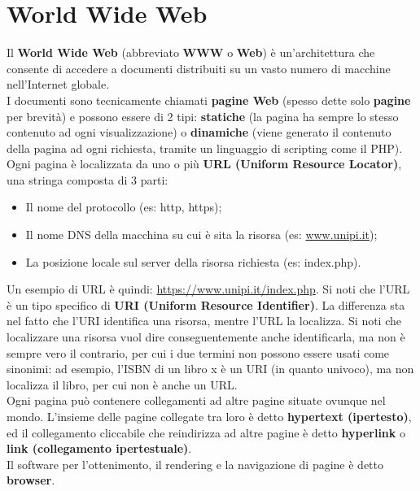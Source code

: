 \section{World Wide Web}
    Il \textbf{World Wide Web} (abbreviato \textbf{WWW} o \textbf{Web}) è un’architettura che consente di accedere a
    documenti distribuiti su un vasto numero di macchine nell’Internet globale.\\

    I documenti sono tecnicamente chiamati \textbf{pagine Web} (spesso dette solo \textbf{pagine} per brevità) e
    possono essere di 2 tipi: \textbf{statiche} (la pagina ha sempre lo stesso contenuto ad ogni
    visualizzazione) o \textbf{dinamiche} (viene generato il contenuto della pagina ad ogni richiesta,
    tramite un linguaggio di scripting come il PHP). Ogni pagina è localizzata da uno o più \textbf{URL
    (Uniform Resource Locator)}, una stringa composta di 3 parti:

        \begin{itemize}
            \item Il nome del protocollo (es: http, https);
            \item Il nome DNS della macchina su cui è sita la risorsa (es: \url{www.unipi.it});
            \item La posizione locale sul server della risorsa richiesta (es: index.php).
        \end{itemize}

    Un esempio di URL è quindi: \url{https://www.unipi.it/index.php}. Si noti che l’URL è un tipo
    specifico di \textbf{URI (Uniform Resource Identifier)}. La differenza sta nel fatto che l’URI identifica
    una risorsa, mentre l’URL la localizza. Si noti che localizzare una risorsa vuol dire
    conseguentemente anche identificarla, ma non è sempre vero il contrario, per cui i due termini
    non possono essere usati come sinonimi: ad esempio, l’ISBN di un libro x è un URI (in quanto
    univoco), ma non localizza il libro, per cui non è anche un URL.\\
    
    Ogni pagina può contenere collegamenti ad altre pagine situate ovunque nel mondo. L’insieme
    delle pagine collegate tra loro è detto \textbf{hypertext (ipertesto)}, ed il collegamento cliccabile che
    reindirizza ad altre pagine è detto \textbf{hyperlink} o \textbf{link (collegamento ipertestuale)}.\\

    Il software per l’ottenimento, il rendering e la navigazione di pagine è detto \textbf{browser}.

